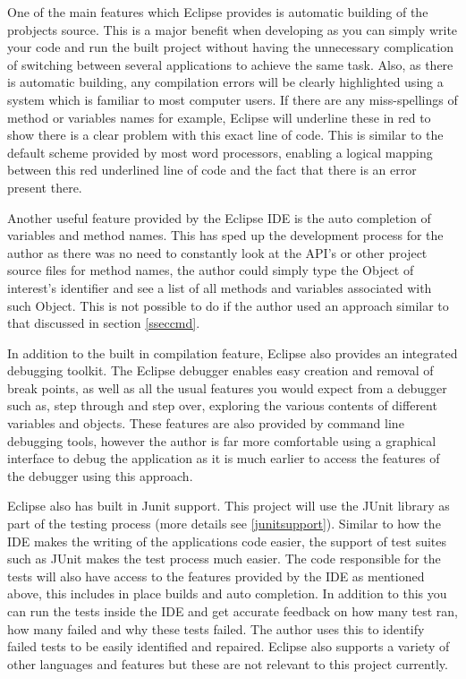 One of the main features which Eclipse provides is automatic building of the probjects source. This is a major benefit when developing as you can simply write your code and run the built project without having the unnecessary complication of switching between several applications to achieve the same task. Also, as there is automatic building, any compilation errors will be clearly highlighted using a system which is familiar to most computer users. If there are any miss-spellings of method or variables names for example, Eclipse will underline these in red to show there is a clear problem with this exact line of code. This is similar to the default scheme provided by most word processors, enabling a logical mapping between this red underlined line of code and the fact that there is an error present there.

Another useful feature provided by the Eclipse IDE is the auto completion of variables and method names. This has sped up the development process for the author as there was no need to constantly look at the API's or other project source files for method names, the author could simply type the Object of interest's identifier and see a list of all methods and variables associated with such Object. This is not possible to do if the author used an approach similar to that discussed in section \ref{sseccmd}.

In addition to the built in compilation feature, Eclipse also provides an integrated debugging toolkit. The Eclipse debugger enables easy creation and removal of break points, as well as all the usual features you would expect from a debugger such as, step through and step over, exploring the various contents of different variables and objects. These features are also provided by command line debugging tools, however the author is far more comfortable using a graphical interface to debug the application as it is much earlier to access the features of the debugger using this approach.

Eclipse also has built in Junit support. This project will use the JUnit library as part of the testing process (more details see \ref{junitsupport}). Similar to how the IDE makes the writing of the applications code easier, the support of test suites such as JUnit makes the test process much easier. The code responsible for the tests will also have access to the features provided by the IDE as mentioned above, this includes in place builds and auto completion. In addition to this you can run the tests inside the IDE and get accurate feedback on how many test ran, how many failed and why these tests failed. The author uses this to identify failed tests to be easily identified and repaired. Eclipse also supports a variety of other languages and features but these are not relevant to this project currently.

